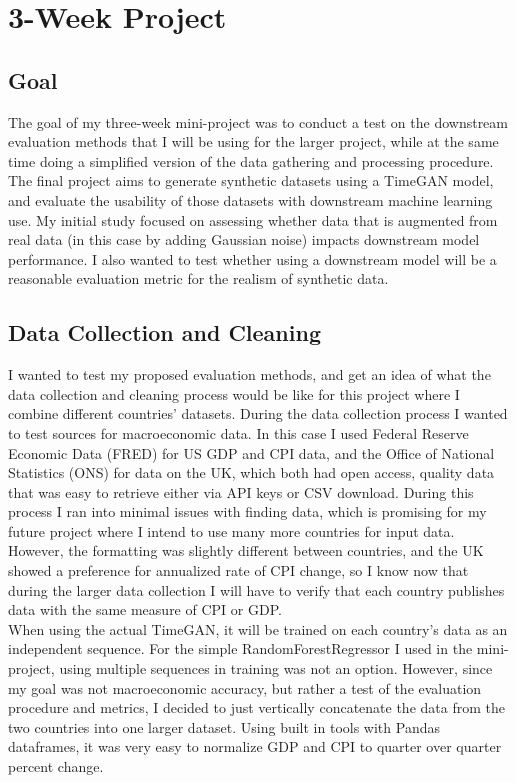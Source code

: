 \documentclass[10pt,twocolumn]{article}
\begin{document}
\section{3-Week Project}

\subsection{Goal}
The goal of my three-week mini-project was to conduct a test on the downstream evaluation methods that I will be using for the larger project, while at the same time doing a simplified version of the data gathering and processing procedure. The final project aims to generate synthetic datasets using a TimeGAN model, and evaluate the usability of those datasets  with downstream machine learning use. My initial study focused on assessing whether data that is augmented from real data (in this case by adding Gaussian noise) impacts downstream model performance. I also wanted to test whether using a downstream model will be a reasonable evaluation metric for the realism of synthetic data.

\subsection{Data Collection and Cleaning}
I wanted to test my proposed evaluation methods, and get an idea of what the data collection and cleaning process would be like for this project where I combine different countries' datasets. During the data collection process I wanted to test sources for macroeconomic data. In this case I used Federal Reserve Economic Data (FRED) for US GDP and CPI data, and the Office of National Statistics (ONS) for data on the UK, which both had open access, quality data that was easy to retrieve either via API keys or CSV download. During this process I ran into minimal issues with finding data, which is promising for my future project where I intend to use many more countries for input data. However, the formatting was slightly different between countries, and the UK showed a preference for annualized rate of CPI change, so I know now that during the larger data collection I will have to verify that each country publishes data with the same measure of CPI or GDP.\\
When using the actual TimeGAN, it will be trained on each country's data as an independent sequence. For the simple RandomForestRegressor I used in the mini-project, using multiple sequences in training was not an option. However, since my goal was not macroeconomic accuracy, but rather a test of the evaluation procedure and metrics, I decided to just vertically concatenate the data from the two countries into one larger dataset. Using built in tools with Pandas dataframes, it was very easy to normalize GDP and CPI to quarter over quarter percent change.
\end{document}
